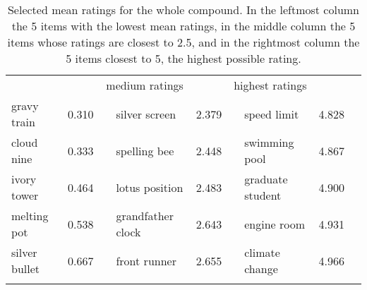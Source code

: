 \begin{table}[!htb]
  \centering
\footnotesize
\begin{tabular}{@{}lcclcclcc@{}}\lsptoprule
\multicolumn{2}{c}{lowest ratings}&\phantom{abc}&\multicolumn{2}{c}{medium ratings}&\phantom{abc}&\multicolumn{2}{c}{highest ratings}\\
\cmidrule{1-2}\cmidrule{4-5}\cmidrule{7-8}
gravy train& 0.310&&silver screen& 2.379&&      speed limit& 4.828\\       
cloud nine& 0.333&&spelling bee& 2.448&&       swimming pool& 4.867\\     
ivory tower& 0.464&&lotus position& 2.483&&     graduate student& 4.900\\  
melting pot& 0.538&&grandfather clock& 2.643&&  engine room& 4.931\\       
silver bullet& 0.667&&front runner& 2.655&&       climate change& 4.966\\      
      \lspbottomrule   
\end{tabular}
  \caption{Selected mean ratings for the whole compound. In the leftmost column the 5 items with the lowest mean ratings, in the middle column the 5 items whose ratings are closest to 2.5, and in the rightmost column the 5 items closest to 5, the highest possible rating.}

  \label{tab:whole-constituent-ratings}
\end{table}

